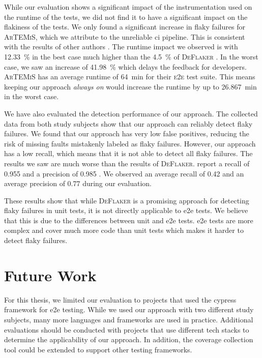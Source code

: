 While our evaluation shows a significant impact of the instrumentation used on the runtime of the tests, we did not find it to have a significant impact on the flakiness of the tests.
We only found a significant increase in flaky failures for \textsc{ArTEMiS}, which we attribute to the unreliable \ac{ci} pipeline.
This is consistent with the results of other authors \autocite{rasheed_effect_2023}.
The runtime impact we observed is with \SI{12.33}{\percent} in the best case much higher than the \SI{4.5}{\percent} of \textsc{DeFlaker} \autocite{bell_deflaker_2018}.
In the worst case, we saw an increase of \SI{41.98}{\percent} which delays the feedback for developers.
\textsc{ArTEMiS} has an average runtime of \SI{64}{\minute} for their \textsc{e2e} test suite.
This means keeping our approach \textit{always on} would increase the runtime by up to \SI{26.867}{\minute} in the worst case.

We have also evaluated the detection performance of our approach.
The collected data from both study subjects show that our approach can reliably detect flaky failures.
We found that our approach has very low false positives, reducing the risk of missing faults mistakenly labeled as flaky failures.
However, our approach has a low recall, which means that it is not able to detect all flaky failures.
The results we saw are much worse than the results of \textsc{DeFlaker}.
 report a recall of \num{0.955} and a precision of \num{0.985} \cite{bell_deflaker_2018}.
We observed an average recall of \num{0.42} and an average precision of \num{0.77} during our evaluation.

These results show that while \textsc{DeFlaker} is a promising approach for detecting flaky failures in unit tests, it is not directly applicable to \ac{e2e} tests.
We believe that this is due to the differences between unit and \ac{e2e} tests.
\Ac{e2e} tests are more complex and cover much more code than unit tests which makes it harder to detect flaky failures.

\section{Future Work}
For this thesis, we limited our evaluation to projects that used the cypress framework for \ac{e2e} testing.
While we used our approach with two different study subjects, many more languages and frameworks are used in practice.
Additional evaluations should be conducted with projects that use different tech stacks to determine the applicability of our approach.
In addition, the coverage collection tool could be extended to support other testing frameworks.

